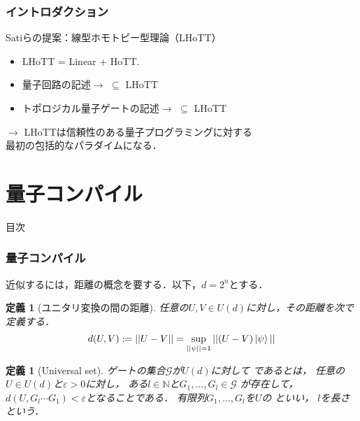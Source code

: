 \documentclass{beamer} %
\newcommand{\N}{\mathbb{N}}%
\renewcommand{\epsilon}{\varepsilon}
\renewcommand{\subset}{\subseteq}
\newtheorem{dfn}[thm]{定義}
\newcommand{\0}{\mathbf{0}}
\newcommand{\1}{\mathbf{1}}
\newcommand{\2}{\mathbf{2}}
\begin{document}
\begin{frame}
  \frametitle{イントロダクション}
  \begin{block}{Satiらの提案：線型ホモトピー型理論（LHoTT）}
    \begin{itemize}
      \item LHoTT = Linear + HoTT.
      \item 量子回路の記述\(\to\) \(\subset\) LHoTT
      \item トポロジカル量子ゲートの記述\(\to\)
             \(\subset\) LHoTT
    \end{itemize}
    \begin{center}
      \(\longrightarrow\)
      LHoTTは信頼性のある量子プログラミングに対する\\
      最初の包括的なパラダイムになる．
    \end{center}
  \end{block}
\end{frame}

\section{量子コンパイル}
\begin{frame}[noframenumbering]{目次}
  \tableofcontents[currentsection]
\end{frame}

\begin{frame}
  \frametitle{量子コンパイル}
  近似するには，距離の概念を要する．以下，\(d=2^n\)とする．
  \begin{dfn}[ユニタリ変換の間の距離]
    任意の\(U,V\in U(d)\)に対し，その距離を次で定義する．
    \[
      d(U,V):=||U-V||=\sup_{||\psi||=1}||(U-V)\ket{\psi}||
    \]
  \end{dfn}

  \begin{dfn}[Universal set]
    ゲートの集合\(\mathcal{G}\)が\(U(d)\)に対して
    であるとは，
    任意の\(U\in U(d)\)と\(\epsilon >0\)に対し，
    ある\(l\in\N\)と\(G_1,\ldots,G_l\in\mathcal{G}\)
    が存在して，\(d(U,G_l\cdots G_1)<\epsilon\)となることである．
    有限列\(G_1,\ldots,G_l\)を\(U\)の
    \structure{\(\epsilon\)近似列}といい，
    \(l\)を長さという．
  \end{dfn}
\end{frame}
\end{document}
